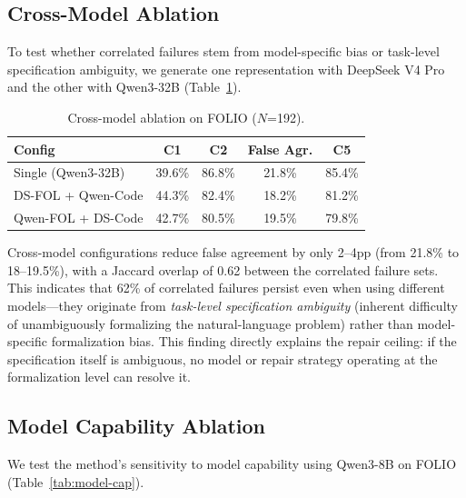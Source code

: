 \documentclass[11pt,a4paper]{article}
\begin{document}
\subsection{Cross-Model Ablation}
\label{sec:cross-model}

To test whether correlated failures stem from model-specific bias or task-level specification ambiguity, we generate one representation with DeepSeek V4 Pro and the other with Qwen3-32B (Table~\ref{tab:cross-model}).

\begin{table}[t]
\centering
\small
\caption{Cross-model ablation on FOLIO ($N$=192).}
\label{tab:cross-model}
\begin{tabular}{lcccc}
\toprule
\textbf{Config} & \textbf{C1} & \textbf{C2} & \textbf{False Agr.} & \textbf{C5} \\
\midrule
Single (Qwen3-32B) & 39.6\% & 86.8\% & 21.8\% & 85.4\% \\
DS-FOL + Qwen-Code & 44.3\% & 82.4\% & 18.2\% & 81.2\% \\
Qwen-FOL + DS-Code & 42.7\% & 80.5\% & 19.5\% & 79.8\% \\
\bottomrule
\end{tabular}
\end{table}

Cross-model configurations reduce false agreement by only 2--4pp (from 21.8\% to 18--19.5\%), with a Jaccard overlap of 0.62 between the correlated failure sets. This indicates that 62\% of correlated failures persist even when using different models---they originate from \emph{task-level specification ambiguity} (inherent difficulty of unambiguously formalizing the natural-language problem) rather than model-specific formalization bias. This finding directly explains the repair ceiling: if the specification itself is ambiguous, no model or repair strategy operating at the formalization level can resolve it.

\subsection{Model Capability Ablation}
\label{sec:model-cap}

We test the method's sensitivity to model capability using Qwen3-8B on FOLIO (Table~\ref{tab:model-cap}).
\end{document}
